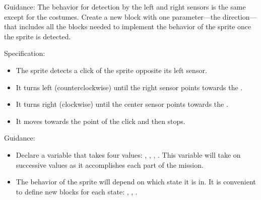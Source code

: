 Guidance: The behavior for detection by the left and right sensors is
the same except for the costumes. Create a new block
 with one parameter---the direction---that
includes all the blocks needed to implement the behavior of the
 sprite once the  sprite is detected.

\newpage



Specification:

\begin{itemize}
\item The  sprite detects a click of the  sprite
opposite its left sensor.
\item It turns left (counterclockwise) until the right sensor points
towards the .
\item It turns right (clockwise) until the center sensor points towards
the .
\item It moves towards the point of the click and then stops.
\end{itemize}

Guidance:

\begin{itemize}

\item Declare a variable that takes four values:
, , , . This variable
will take on successive values as it accomplishes each part of the
mission.

\item The behavior of the  sprite will depend on which state
it is in. It is convenient to define new blocks for each state:
, , .

\end{itemize}
